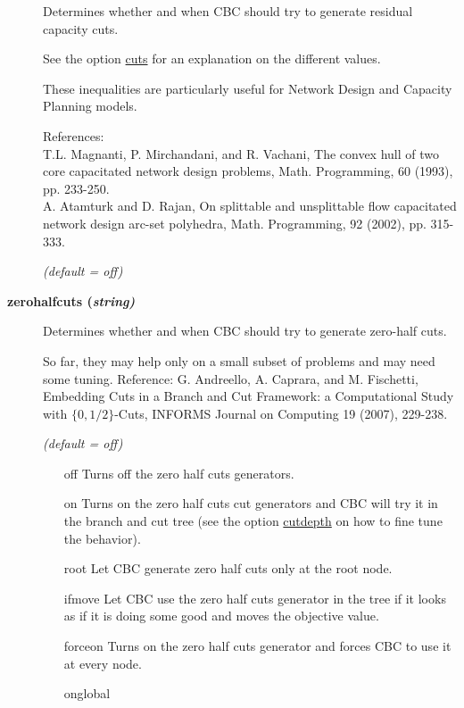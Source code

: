\begin{description}
Determines whether and when CBC should try to generate residual capacity cuts.

See the option \hyperlink{cuts}{cuts} for an explanation on the different values.

These inequalities are particularly useful for Network Design and Capacity Planning models.

References:\\
T.L. Magnanti, P. Mirchandani, and R. Vachani, The convex hull of two core capacitated network design problems, Math. Programming, 60 (1993), pp. 233-250.\\
A. Atamturk and D. Rajan, On splittable and unsplittable flow capacitated network design arc-set polyhedra, Math. Programming, 92 (2002), pp. 315-333.

\textsl{(default = off)}

\item[\label{zerohalfcuts}\hypertarget{zerohalfcuts}
{\textbf{zerohalfcuts (\slshape{string})}}]\hspace{1.0in}

Determines whether and when CBC should try to generate zero-half cuts.

So far, they may help only on a small subset of problems and may need some tuning.
Reference: G. Andreello, A. Caprara, and M. Fischetti, Embedding Cuts in a Branch and Cut Framework: a Computational Study with $\{0,1/2\}$-Cuts, INFORMS Journal on Computing 19 (2007), 229-238.

\textsl{(default = off)}
\begin{itemize}
\item[off] 
Turns off the zero half cuts generators.
\item[on] 
Turns on the zero half cuts cut generators and CBC will try it in the branch and cut tree (see the option \hyperlink{cutdepth}{cutdepth} on how to fine tune the behavior).
\item[root] 
Let CBC generate zero half cuts only at the root node.
\item[ifmove] 
Let CBC use the zero half cuts generator in the tree if it looks as if it is doing some good and moves the objective value.
\item[forceon] 
Turns on the zero half cuts generator and forces CBC to use it at every node.
\item[onglobal]
\end{itemize}

\end{description}

